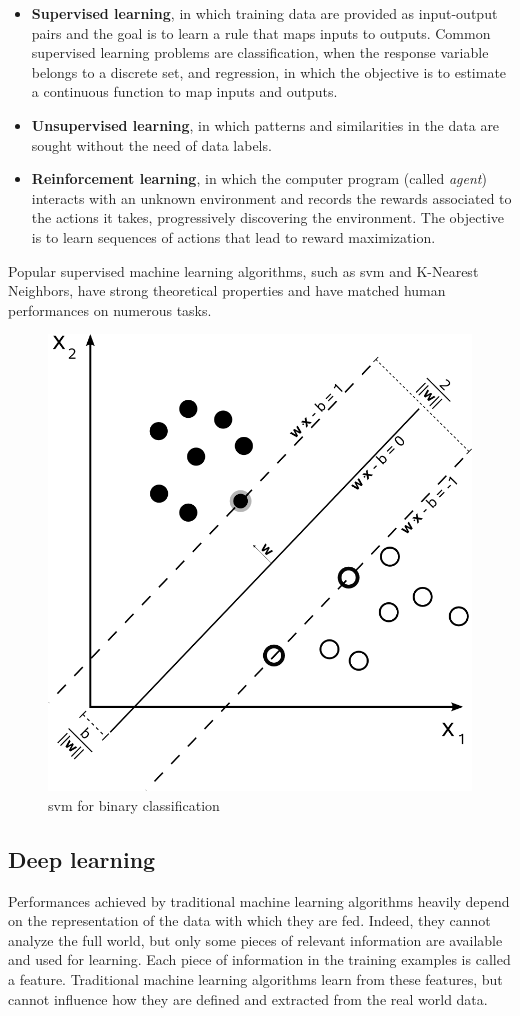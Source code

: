 \documentclass[%
    corpo=12pt,
    twoside,
    stile=classica,   
    tipotesi=magistrale,
    evenboxes,
    english,
	numerazioneromana,
]{toptesi}
\begin{document}
\begin{itemize}
	\item \textbf{Supervised learning}, in which training data are provided as input-output pairs and the goal is to learn a rule that maps inputs to outputs. Common supervised learning problems are classification, when the response variable belongs to a discrete set, and regression, in which the objective is to estimate a continuous function to map inputs and outputs.
	\item \textbf{Unsupervised learning}, in which patterns and similarities in the data are sought without the need of data labels.
	\item \textbf{Reinforcement learning}, in which the computer program (called \textit{agent}) interacts with an unknown environment and records the rewards associated to the actions it takes, progressively discovering the environment. The objective is to learn sequences of actions that lead to reward maximization.
\end{itemize}

Popular supervised machine learning algorithms, such as \gls{svm} and K-Nearest Neighbors, have strong theoretical properties and have matched human performances on numerous tasks.

\begin{figure}[ht]
	\centering
	\includegraphics[width=.4\linewidth]{imgs/svm.png}
	\caption{\Gls{svm} for binary classification}
	\label{fig:supervised}
\end{figure}

\subsection{Deep learning}
Performances achieved by traditional machine learning algorithms heavily depend on the representation of the data with which they are fed. Indeed, they cannot analyze the full world, but only some pieces of relevant information are available and used for learning. Each piece of information in the training examples is called a feature. Traditional machine learning algorithms learn from these features, but cannot influence how they are defined and extracted from the real world data.
\end{document}
